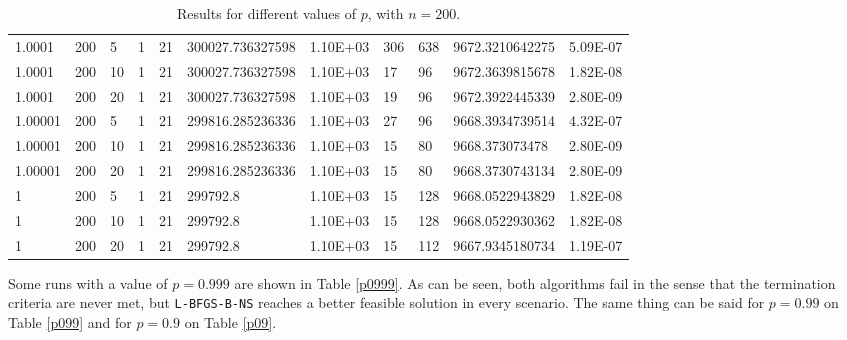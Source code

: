 \begin{table}
\begin{center}
\begin{tabular}{|l|l|l|l|l|l|l|l|l|l|l|}
      1.0001 & 200 & 5 &  1 & 21 & 300027.736327598 & 1.10E+03 & 306 & 638 & 9672.3210642275 & 5.09E-07\\
      1.0001 & 200 & 10 &  1 & 21 & 300027.736327598 & 1.10E+03 & 17 & 96 & 9672.3639815678 & 1.82E-08\\
      1.0001 & 200 & 20 &  1 & 21 & 300027.736327598 & 1.10E+03 & 19 & 96 & 9672.3922445339 & 2.80E-09\\
      1.00001 & 200 & 5 &  1 & 21 & 299816.285236336 & 1.10E+03 & 27 & 96 & 9668.3934739514 & 4.32E-07\\
      1.00001 & 200 & 10 &  1 & 21 & 299816.285236336 & 1.10E+03 & 15 & 80 & 9668.373073478 & 2.80E-09\\
      1.00001 & 200 & 20 &  1 & 21 & 299816.285236336 & 1.10E+03 & 15 & 80 & 9668.3730743134 & 2.80E-09\\
      1 & 200 & 5 & 1 &  21  & 299792.8 & 1.10E+03 & 15 & 128 & 9668.0522943829 & 1.82E-08\\
      1 & 200 & 10 & 1 &  21 & 299792.8 & 1.10E+03 & 15 & 128 & 9668.0522930362 & 1.82E-08\\
      1 & 200 & 20 & 1 &  21 & 299792.8 & 1.10E+03 & 15 & 112 & 9667.9345180734 & 1.19E-07\\
      \hline
    \end{tabular}
    \caption[Number of algorithm Iterations Changing $p$]{Results for different values of $p$, with $n = 200$.}
    \label{pmtable}
  \end{center}
\end{table}

Some runs with a value of $p = 0.999$ are shown in Table \ref{p0999}. As can be seen, both algorithms fail in the sense that the termination criteria are never met, but \texttt{L-BFGS-B-NS} reaches a better feasible solution in every scenario. The same thing can be said for $p = 0.99$ on Table \ref{p099} and for $p = 0.9$ on Table \ref{p09}.

